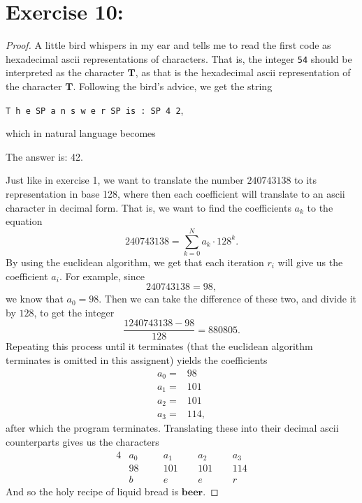 \documentclass{article}
\begin{document}
\section*{Exercise 10:}
\begin{proof}
A little bird whispers in my ear and tells me to read the first code as 
hexadecimal ascii representations of characters. That is, the integer 
\texttt{54} should be interpreted as the character $\mathbf{T}$, as
that is the hexadecimal ascii representation of the character  
$\mathbf{T}$. Following the bird's advice, we get the string 
\begin{center}
    \texttt{T h e SP a n s w e r SP is : SP 4 2},
\end{center} which in natural language becomes 
\begin{center}
    The answer is: 42.
\end{center}
Just like in exercise 1, we want to translate the number 
$240743138$ to its representation in base 128, where then each coefficient
will translate to an ascii character in decimal form. That is, we want
to find the coefficients $a_{k}$ to the equation 
\[
240743138 = \sum\limits_{k=0}^{N} a_{k}\cdot 128^k.
\] 
By using the euclidean algorithm, we get that each iteration 
$r_{i}$ will give us the coefficient $a_{i}$. For example, since 
\[  240743138 = 98,\]
we know that $a_0 = 98$. Then we can take the difference of these two, 
and divide it by  $128$, to get the integer \[
    \frac{1240743138 - 98}{128} =880805.
\] Repeating this process until it terminates (that the euclidean 
algorithm terminates is omitted in this assignent) yields the coefficients 
\begin{align*}
    a_0 =&  98 \\
    a_1 =& 101 \\
    a_2 =& 101 \\
    a_3 =& 114, 
\end{align*} after which the program terminates. Translating these into
their decimal ascii counterparts gives us the characters 
\begin{alignat*}{4}
    & a_0 \quad && a_1  \quad && a_2 \quad  && a_3 \\
    & 98   && 101 && 101 &&  114 \\
    & b && e && e && r
\end{alignat*}
And so the holy recipe of liquid bread is $\mathbf{beer}$.
\end{proof}
\end{document}
